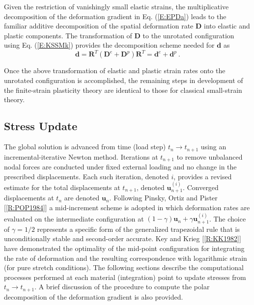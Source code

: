 \documentclass[11pt]{report}
\numberwithin{equation}{section}
\newcommand{\bmf } {\boldsymbol }  %
\newcommand{\nid}{\noindent}
\begin{document}
Given the restriction of vanishingly small elastic strains, the multiplicative 
decomposition of the deformation gradient in Eq. (\ref{E:EPDa}) leads to the 
familiar additive decomposition of the spatial deformation rate $\mathbf{D}$ 
into elastic and
plastic components. The transformation of $\mathbf{D}$ to the unrotated configuration 
using Eq. (\ref{E:KSSMk}) provides the decomposition scheme needed for $\mathbf{d}$ as
%
\begin{equation}\label{E:EPDh}
\mathbf{d} = \mathbf{R}^T\left ( \mathbf{D}^e+\mathbf{D}^p \right )\mathbf{R}^T
= \mathbf{d}^e+\mathbf{d}^p \ .
\end{equation}
%

Once the above transformation of elastic and plastic strain rates onto the 
unrotated configuration is accomplished, the remaining steps in development 
of the finite-strain plasticity theory are identical to those for classical 
small-strain theory.


\subsection{Stress Update}

\nid The global solution is advanced from time (load step) $t_n\rightarrow t_{n+1}$
using an incremental-iterative
Newton method. Iterations at $t_{n+1}$ to remove unbalanced 
nodal forces are conducted under
fixed external loading and no change in the prescribed displacements.
Each such iteration, denoted $i$, provides a 
revised estimate for the total 
displacements at $t_{n+1}$, denoted $\bmf u_{n+1}^{(i)}$. Converged 
displacements at $t_n$ are denoted $\bmf u_n$. 
Following Pinsky, Ortiz and Pister [\ref{R:POP1984}] a 
mid-increment scheme is adopted in which 
deformation rates are evaluated on the intermediate configuration 
at $(1-\gamma)\bmf u_n + \gamma \bmf u_{n+1}^{(i)}$. The choice
of $\gamma = 1/2$ represents a specific form of the generalized 
trapezoidal rule that is unconditionally 
stable and second-order accurate. Key and Krieg [\ref{R:KK1982}] 
have demonstrated the optimality 
of the mid-point configuration for integrating the rate of deformation 
and the resulting 
correspondence with logarithmic strain (for pure stretch conditions).
The following sections describe the computational processes performed at each 
material (integration) point to update stresses from  $t_n\rightarrow t_{n+1}$. A brief 
discussion of the procedure 
to compute the polar decomposition of the deformation gradient is also provided.
\end{document}
